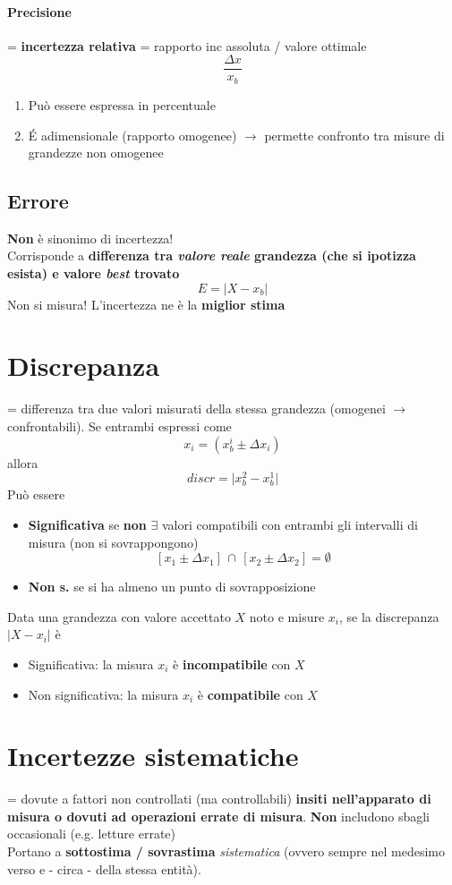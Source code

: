 \documentclass[10pt, oneside]{book}
\begin{document}
\paragraph{Precisione} = \textbf{incertezza relativa} = rapporto inc assoluta / valore ottimale
\[\frac{\Delta x}{x_b}\]
\begin{enumerate}
\item Può essere espressa in percentuale
\item \'E adimensionale (rapporto omogenee) $\rightarrow$ permette confronto tra misure di grandezze non omogenee
\end{enumerate}

\subsection{Errore}
\textbf{Non} è sinonimo di incertezza!\\
Corrisponde a \textbf{differenza tra \textit{valore reale} grandezza (che si ipotizza esista) e valore \textit{best} trovato}
\[E = \big| X - x_b\big|\]
Non si misura! L'incertezza ne è la \textbf{miglior stima}

\section{Discrepanza}
= differenza tra due valori misurati della stessa grandezza (omogenei $\rightarrow$ confrontabili). Se entrambi espressi come 
\[x_i = (x_b^i \pm \Delta x_i)\]
allora
\[discr = \big| x_b^2 - x_b^1\big|\]
Può essere
\begin{itemize}
\item \textbf{Significativa} se \textbf{non} $\exists$ valori compatibili con entrambi gli intervalli di misura (non si sovrappongono)
\[ [x_1 \pm \Delta x_1] \, \cap \, [x_2 \pm \Delta x_2] = \emptyset \]
\item \textbf{Non s.} se si ha almeno un punto di sovrapposizione
\end{itemize}
Data una grandezza con valore accettato $X$ noto e misure $x_i$, se la discrepanza $\displaystyle \big| X - x_i \big|$ è
\begin{itemize}
\item Significativa: la misura $x_i$ è \textbf{incompatibile} con $X$
\item Non significativa: la misura $x_i$ è \textbf{compatibile} con $X$
\end{itemize}

\section{Incertezze sistematiche}
= dovute a fattori non controllati (ma controllabili) \textbf{insiti nell'apparato di misura o dovuti ad operazioni errate di misura}. \textbf{Non} includono sbagli occasionali (e.g. letture errate)\\
Portano a \textbf{sottostima / sovrastima} \textit{sistematica} (ovvero sempre nel medesimo verso e - circa - della stessa entità).
\end{document}
